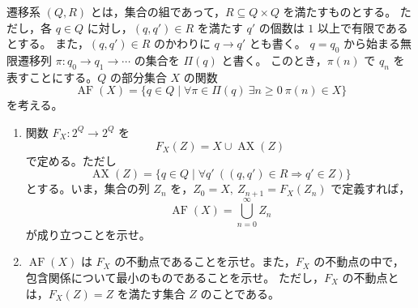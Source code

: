 \newcommand{\C}{\mathbb{C}}
\newcommand{\R}{\mathbb{R}}
\newcommand{\Z}{\mathbb{Z}}
\newcommand{\Tr}{\operatorname{Tr}}
\newcommand{\Impart}{\operatorname{Im}}
\newcommand{\AF}{\operatorname{AF}}
\newcommand{\AX}{\operatorname{AX}}
\newcommand{\GL}{\operatorname{GL}}


遷移系 \((Q,R)\) とは，集合の組であって，\(R\subseteq Q\times Q\) を満たすものとする。
ただし，各 \(q\in Q\) に対し，\((q,q')\in R\) を満たす \(q'\) の個数は \(1\) 以上で有限であるとする。
また，\((q,q')\in R\) のかわりに \(q\to q'\) とも書く。
\(q=q_0\) から始まる無限遷移列 \(\pi:q_0\to q_1\to\cdots\) の集合を \(\Pi(q)\) と書く。
このとき，\(\pi(n)\) で \(q_n\) を表すことにする。\(Q\) の部分集合 \(X\) の関数
\[
  \AF(X)=\{q\in Q\mid \forall \pi\in\Pi(q)\ \exists n\ge0\ \pi(n)\in X\}
\]
を考える。

\begin{enumerate}
  \item 関数 \(F_X:2^Q\to 2^Q\) を
  \[
    F_X(Z)=X\cup \AX(Z)
  \]
  で定める。ただし
  \[
    \AX(Z)=\{q\in Q\mid \forall q'\ ((q,q')\in R\Rightarrow q'\in Z)\}
  \]
  とする。いま，集合の列 \(Z_n\) を，\(Z_0=X,\ Z_{n+1}=F_X(Z_n)\) で定義すれば，
  \[
    \AF(X)=\bigcup_{n=0}^{\infty}Z_n
  \]
  が成り立つことを示せ。
  \item \(\AF(X)\) は \(F_X\) の不動点であることを示せ。また，\(F_X\) の不動点の中で，包含関係について最小のものであることを示せ。
  ただし，\(F_X\) の不動点とは，\(F_X(Z)=Z\) を満たす集合 \(Z\) のことである。
\end{enumerate}

%